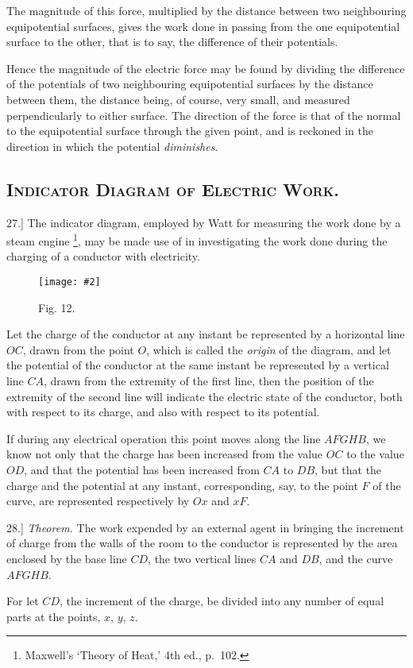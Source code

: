 \documentclass[12pt,oneside]{book}[2021/10/04]
\let\oldfootnote\footnote
\renewcommand\footnote[1]{%
\oldfootnote{\hspace{0.14em}#1}}
\newcommand{\Heading}{\centering\normalfont}
\newcommand{\Section}[1]{\subsection*{\normalsize\Heading\scshape #1}}
\newcommand{\Runhead}[1]{\fancyhead[C]{\iffloatpage{}{\small#1}}}
\newcommand{\article}[1]{\phantomsection \label{art:#1}{#1.]}}
\newcommand{\widefig}[3]{
\begin{figure}[ht!]
\centering
\texttt{[image: \#2]}
\caption*{\small #3}
\end{figure}}
\newcommand{\¬}{\hphantom{0}}
\begin{document}
The magnitude of this force, multiplied by the distance between
two neighbouring equipotential surfaces, gives the work done in
passing from the one equipotential surface to the other, that is to
say, the difference of their potentials.

Hence the magnitude of the electric force may be found by
dividing the difference of the potentials of two neighbouring equipotential
surfaces by the distance between them, the distance
being, of course, very small, and measured perpendicularly to
either surface. The direction of the force is that of the normal
to the equipotential surface through the given point, and is
reckoned in the direction in which the potential \textit{diminishes}.

\Section{Indicator Diagram of Electric Work.}

\article{27} The indicator diagram, employed by Watt for measuring
the work done by a steam engine\footnote{
Maxwell's `Theory of Heat,' 4th ed., p.\ 102.}, may be made use of in investigating
the work done during the charging of a conductor with
electricity.

\widefig{0.65}{041.png}{Fig. 12.}
Let the charge of the conductor at any instant be represented by
a horizontal line \(OC\), drawn from the point \(O\), which is called the
\textit{origin} of the diagram, and let the potential of the conductor at
the same instant be represented by a vertical line \(CA\), drawn from
the extremity of the first line, then the position of the extremity
of the second line will indicate the electric state of the conductor,
both with respect to its charge, and also with respect to its
potential.

\Runhead{DIAGRAM OF WORK.}
If during any electrical operation this point moves along the
line \(AFGHB\), we know not only that the charge has been increased
from the value \(OC\) to the value \(OD\), and that the potential has
been increased from \(CA\) to \(DB\), but that the charge and the
potential at any instant, corresponding, say, to the point \(F\) of the
curve, are represented respectively by \(Ox\) and \(xF\).

\article{28} \textit{Theorem.} The work expended by an external agent in
bringing the increment of charge from the walls of the room to
the conductor is represented by the area enclosed by the base line
\(CD\), the two vertical lines \(CA\) and \(DB\), and the curve \(AFGHB\).

For let \(CD\), the increment of the charge, be divided into any
number of equal parts at the points, \(x\), \(y\), \(z\).
\end{document}
